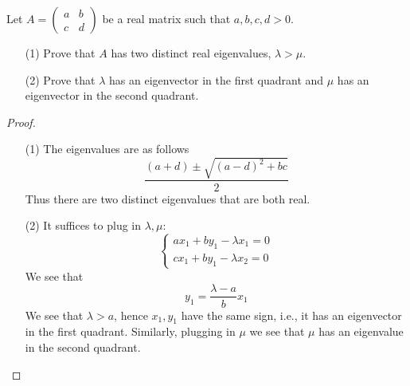\documentclass[openany]{book}
\begin{document}
\begin{prob}
    Let \(A = \begin{pmatrix} a & b \\ c & d \end{pmatrix}\) be a real matrix such that \(a,b,c,d > 0\).
    \begin{itemize}
        \item[(1)] Prove that \(A\) has two distinct real eigenvalues, \(\lambda > \mu\).
        \item[(2)] Prove that \(\lambda\) has an eigenvector in the first quadrant and \(\mu\) has an eigenvector in the second quadrant.
    \end{itemize}
\end{prob}
\begin{proof}
    \begin{itemize}
        \item[(1)] The eigenvalues are as follows
        \begin{equation*}
            \frac{(a+d)\pm\sqrt{(a-d)^2+bc}}{2}
        \end{equation*}
        Thus there are two distinct eigenvalues that are both real.
        \item[(2)] It suffices to plug in $\lambda,\mu$:
        \begin{equation*}
            \begin{cases}
                ax_1+by_1-\lambda x_1=0\\
                cx_1+by_1-\lambda x_2=0
            \end{cases} 
        \end{equation*}
        We see that 
        \begin{equation*}
            y_1=\frac{\lambda-a}{b}x_1
        \end{equation*}
        We see that $\lambda>a$, hence $x_1, y_1$ have the same sign, i.e., it has an eigenvector in the first quadrant. Similarly, plugging in $\mu$ we see that $\mu$ has an eigenvalue in the second quadrant.
    \end{itemize}
\end{proof}
\end{document}
